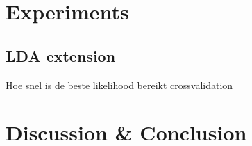 \documentclass[11pt,a4paper]{article}
\begin{document}
\section{Experiments}

\subsection{LDA extension}
Hoe snel is de beste likelihood bereikt
crossvalidation


\section{Discussion \& Conclusion}



\appendix

{}

\end{document}
